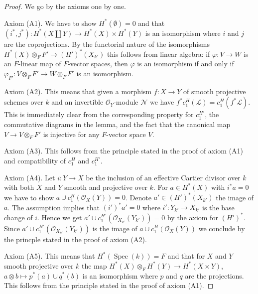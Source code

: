 \documentclass[10pt,a4paper]{amsart}
\theoremstyle{plain}
\theoremstyle{definition}
\theoremstyle{remark}
\numberwithin{equation}{subsection}
\def\Spec{\mathop{\mathrm{Spec}}}
\begin{document}
\begin{proof}
We go by the axioms one by one.

\medskip\noindent
Axiom (A1). We have to show $H^*(\emptyset) = 0$ and that
$(i^*, j^*) : H^*(X \amalg Y) \to H^*(X) \times H^*(Y)$
is an isomorphism where $i$ and $j$ are the coprojections.
By the functorial nature of the isomorphisms
$H^*(X) \otimes_F F' \to (H')^*(X_{k'})$ this
follows from linear algebra: if $\varphi : V \to W$ is an $F$-linear map
of $F$-vector spaces, then $\varphi$ is an isomorphism if and only if
$\varphi_{F'} : V \otimes_F F' \to W \otimes_F F'$ is an isomorphism.

\medskip\noindent
Axiom (A2). This means that given a morphism $f : X \to Y$ of smooth projective
schemes over $k$ and an invertible $\mathcal{O}_Y$-module $\mathcal{N}$
we have $f^*c_1^H(\mathcal{L}) = c_1^H(f^*\mathcal{L})$. This is immediately
clear from the corresponding property for $c_1^{H'}$, the commutative
diagrams in the lemma, and the fact that the canonical map
$V \to V \otimes_F F'$ is injective for any $F$-vector space $V$.

\medskip\noindent
Axiom (A3). This follows from the principle stated in the proof of
axiom (A1) and compatibility of $c_1^H$ and $c_1^{H'}$.

\medskip\noindent
Axiom (A4). Let $i : Y \to X$ be the inclusion of an effective
Cartier divisor over $k$ with both $X$ and $Y$ smooth and projective
over $k$. For $a \in H^*(X)$ with
$i^*a = 0$ we have to show $a \cup c_1^H(\mathcal{O}_X(Y)) = 0$.
Denote $a' \in (H')^*(X_{k'})$ the image of $a$.
The assumption implies that $(i')^*a' = 0$ where $i' : Y_{k'} \to X_{k'}$
is the base change of $i$. Hence we get
$a' \cup c_1^{H'}(\mathcal{O}_{X_{k'}}(Y_{k'})) = 0$ by the axiom
for $(H')^*$. Since $a' \cup c_1^{H'}(\mathcal{O}_{X_{k'}}(Y_{k'}))$
is the image of $a \cup c_1^H(\mathcal{O}_X(Y))$ we conclude by
the princple stated in the proof of axiom (A2).

\medskip\noindent
Axiom (A5). This means that $H^*(\Spec(k)) = F$ and that for $X$ and $Y$ smooth
projective over $k$ the map $H^*(X) \otimes_F H^*(Y) \to H^*(X \times Y)$,
$a \otimes b \mapsto p^*(a) \cup q^*(b)$ is an isomorphism
where $p$ and $q$ are the projections. This follows from the principle
stated in the proof of axiom (A1).


\end{proof}
\end{document}
